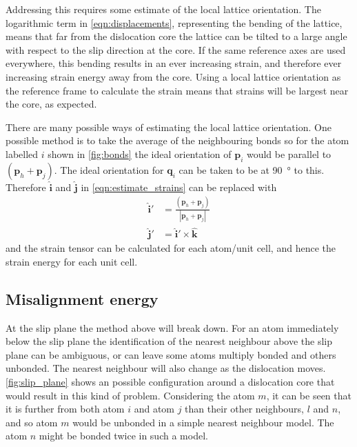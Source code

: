 Addressing this requires some estimate of the local lattice orientation. The logarithmic term in \autoref{eqn:displacements}, representing the bending of the lattice, means that far from the dislocation core the lattice can be tilted to a large angle with respect to the slip direction at the core. If the same reference axes are used everywhere, this bending results in an ever increasing strain, and therefore ever increasing strain energy away from the core. Using a local lattice orientation as the reference frame to calculate the strain means that strains will be largest near the core, as expected.


There are many possible ways of estimating the local lattice orientation. One possible method is to take the average of the neighbouring bonds so for the atom labelled $i$ shown in \autoref{fig:bonds} the ideal orientation of $\mathbf{p}_i$ would be  parallel to $(\mathbf{p}_h + \mathbf{p}_j)$. The ideal orientation for $\mathbf{q}_i$ can be taken to be at \SI{90}{\degree} to this. Therefore $\mathbf{\hat{i}}$ and $\mathbf{\hat{j}}$ in \autoref{eqn:estimate_strains} can be replaced with 
\begin{align}
\mathbf{\hat{i}}' &= \frac{(\mathbf{p}_h + \mathbf{p}_j)}{|\mathbf{p}_h + \mathbf{p}_j|} \nonumber \\
\mathbf{\hat{j}}' &= {\mathbf{\hat{i}}' \times \mathbf{\hat{k}}}
\end{align}
and the strain tensor can be calculated for each atom/unit cell, and hence the strain energy for each unit cell.




\subsection{Misalignment energy}


At the slip plane the method above will break down. For an atom immediately below the slip plane the identification of the nearest neighbour above the slip plane can be ambiguous, or can leave some atoms multiply bonded and others unbonded. The nearest neighbour will also change as the dislocation moves. \autoref{fig:slip_plane} shows an possible configuration around a dislocation core that would result in this kind of problem. Considering the atom $m$, it can be seen that it is further from both atom $i$ and atom $j$ than their other neighbours, $l$ and $n$, and so atom $m$ would be unbonded in a simple nearest neighbour model. The atom $n$ might be bonded twice in such a model.

